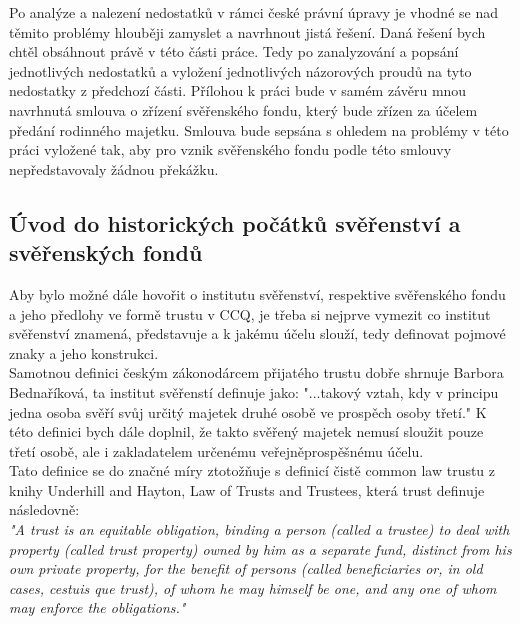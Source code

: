 \documentclass{article}
\begin{document}
Po analýze a nalezení nedostatků v rámci české právní úpravy je vhodné se nad těmito problémy hlouběji zamyslet a navrhnout jistá řešení. Daná řešení bych chtěl obsáhnout právě v této části práce. Tedy po zanalyzování a popsání jednotlivých nedostatků a vyložení jednotlivých názorových proudů na tyto nedostatky z předchozí části. Přílohou k práci bude v samém závěru mnou navrhnutá smlouva o zřízení svěřenského fondu, který bude zřízen za účelem předání rodinného majetku. Smlouva bude sepsána s ohledem na problémy v této práci vyložené tak, aby pro vznik svěřenského fondu podle této smlouvy nepředstavovaly žádnou překážku.

\newpage

\subsection{Úvod do historických počátků svěřenství a svěřenských fondů}

\indent Aby bylo možné dále hovořit o institutu svěřenství, respektive svěřenského fondu a jeho předlohy ve formě trustu v CCQ, je třeba si nejprve vymezit co institut svěřenství znamená, představuje a k jakému účelu slouží, tedy definovat pojmové znaky a jeho konstrukci.\\

Samotnou definici českým zákonodárcem přijatého trustu dobře shrnuje Bar\-bora Bednaříková, ta institut svěřenstí definuje jako: "...takový vztah, kdy v principu jedna osoba svěří svůj určitý majetek druhé osobě ve prospěch osoby třetí." K této definici bych dále doplnil, že takto svěřený majetek nemusí sloužit pouze třetí osobě, ale i zakladatelem určenému veřejněprospěšnému účelu.\\

Tato definice se do značné míry ztotožňuje s definicí čistě common law trustu z knihy Underhill and Hayton, Law of Trusts and Trustees, která trust definuje následovně:\\ 


\textit{"A trust is an equitable obligation, binding a person (called a trustee) to deal with property (called trust property) owned by him as a separate fund, distinct from his own private property, for the benefit of persons (called beneficiaries or, in old cases, cestuis que trust), of whom he may himself be one, and any one of whom may enforce the obligations."} \\
\end{document}
